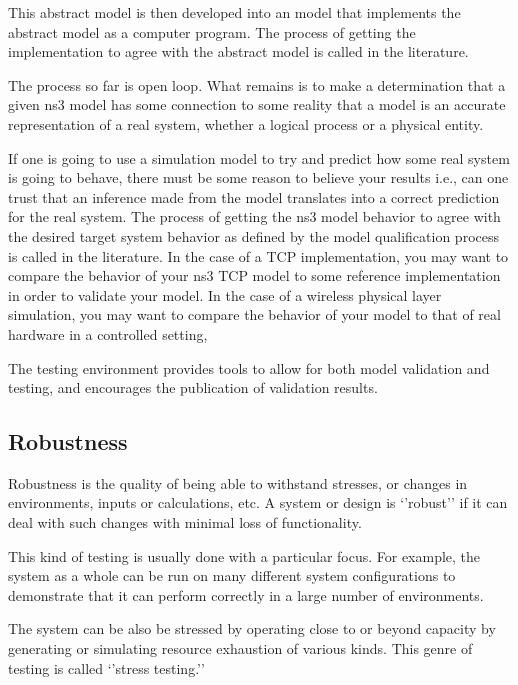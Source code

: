 \documentclass[letterpaper,10pt,english]{sphinxmanual}
\begin{document}
This abstract model is then developed into an  model that
implements the abstract model as a computer program.  The process of getting the
implementation to agree with the abstract model is called  in the literature.

The process so far is open loop. What remains is to make a determination that a
given ns\sphinxhyphen{}3 model has some connection to some reality \textendash{} that a model is an
accurate representation of a real system, whether a logical process or a physical
entity.

If one is going to use a simulation model to try and predict how some real
system is going to behave, there must be some reason to believe your results \textendash{}
i.e., can one trust that an inference made from the model translates into a
correct prediction for the real system.  The process of getting the ns\sphinxhyphen{}3 model
behavior to agree with the desired target system behavior as defined by the model
qualification process is called  in the literature. In the
case of a TCP implementation, you may want to compare the behavior of your ns\sphinxhyphen{}3
TCP model to some reference implementation in order to validate your model.  In
the case of a wireless physical layer simulation, you may want to compare the
behavior of your model to that of real hardware in a controlled setting,

The  testing environment provides tools to allow for both model
validation and testing, and encourages the publication of validation results.


\subsection{Robustness}
\label{\detokenize{test-background:robustness}}
Robustness is the quality of being able to withstand stresses, or changes in
environments, inputs or calculations, etc.  A system or design is ‘’robust’’
if it can deal with such changes with minimal loss of functionality.

This kind of testing is usually done with a particular focus.  For example, the
system as a whole can be run on many different system configurations to
demonstrate that it can perform correctly in a large number of environments.

The system can be also be stressed by operating close to or beyond capacity by
generating or simulating resource exhaustion of various kinds.  This genre of
testing is called ‘’stress testing.’’
\end{document}
